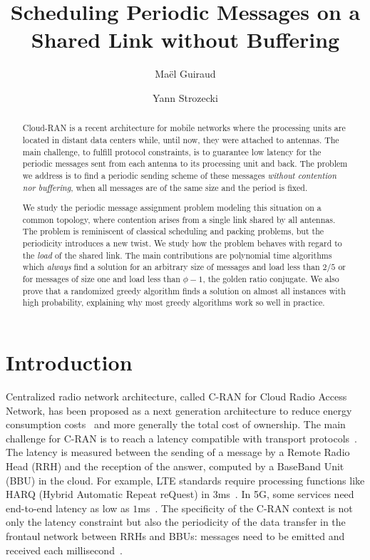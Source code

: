 \documentclass[a4paper,UKenglish,cleveref, autoref, thm-restate]{lipics-v2019}
\title{Scheduling Periodic Messages on a Shared Link without Buffering} %
\author{Ma\"el Guiraud}{CESI, France \and Nokia Bell Labs, France}{mael.guiraud@uvsq.fr}{}{}
\author{Yann Strozecki}{David Laboratory, UVSQ, France }{yann.strozecki@uvsq.fr}{}{}%
\begin{document}
\maketitle


\begin{abstract}
Cloud-RAN is a recent architecture for mobile networks where the processing units are located in distant data centers while, until now, they were attached to antennas. The main challenge, to fulfill protocol constraints, is to guarantee low latency for the periodic messages sent from each antenna to its processing unit and back. The problem we address is to find a periodic sending scheme of these messages \emph{without contention nor buffering}, when all messages are of the same size and the period is fixed.

We study the periodic message assignment problem modeling this situation on a common topology, where contention arises from a single link shared by all antennas. The problem is reminiscent of classical scheduling and packing problems, but the periodicity introduces a new twist. We study how the problem behaves with regard to the \emph{load} of the shared link. 
The main contributions are polynomial time algorithms which \emph{always} find a solution for an arbitrary size of messages and load less than $2/5$ or for messages of size one and load less than $\phi - 1$, the golden ratio conjugate. We also prove that a randomized greedy algorithm finds a solution on almost all instances with high probability, explaining why most greedy algorithms work so well in practice.
\end{abstract}


\section{Introduction}

Centralized radio network architecture, called C-RAN for Cloud Radio Access Network, has been proposed as a next generation architecture to reduce energy consumption costs~\cite{gavrilovska2020cloud,mobile2011c,checko2014cloud} and more generally the total cost of ownership. The main challenge for C-RAN is to reach a latency compatible with transport protocols~\cite{ieeep802}. The latency is measured between the sending of a message by a Remote Radio Head (RRH) and the reception of the answer, computed by a BaseBand Unit (BBU) in the cloud. For example, LTE standards require processing functions like HARQ (Hybrid Automatic Repeat reQuest) in $3$ms~\cite{bouguen2012lte}. In 5G, some services need end-to-end latency as low as $1$ms~\cite{dogra2020survey,boccardi2014five}. The specificity of the C-RAN context is not only the latency constraint but also the periodicity of the data transfer in the frontaul network between RRHs and BBUs: messages need to be emitted and received each millisecond~\cite{3gpp5g,bouguen2012lte}. 
\end{document}
